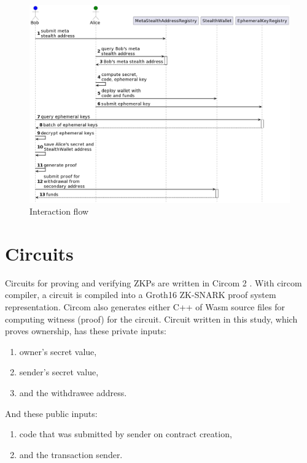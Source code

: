 \begin{figure}[h!]
    \centering
    \includegraphics[width=\textwidth]{assets/images/implementation-flow.png}
    \caption{Interaction flow}
    \label{fig:interaction-flow}
    \vspace{0.5cm}
\end{figure}


\section{Circuits}

Circuits for proving and verifying ZKPs are written in Circom 2 \cite{circomCircomDocumentation}.
With circom compiler, a circuit is compiled into a Groth16
ZK-SNARK proof system \cite{Groth16} representation. Circom also generates
either C++ of Wasm source files for computing witness (proof) for the
circuit. Circuit written in this study, which proves ownership, has
these private inputs:
\begin{enumerate}
    \item owner's secret value,
    \item sender's secret value,
    \item and the withdrawee address.
\end{enumerate}
And these public inputs:
\begin{enumerate}
    \item code that was submitted by sender on contract creation,
    \item and the transaction sender.
\end{enumerate}

